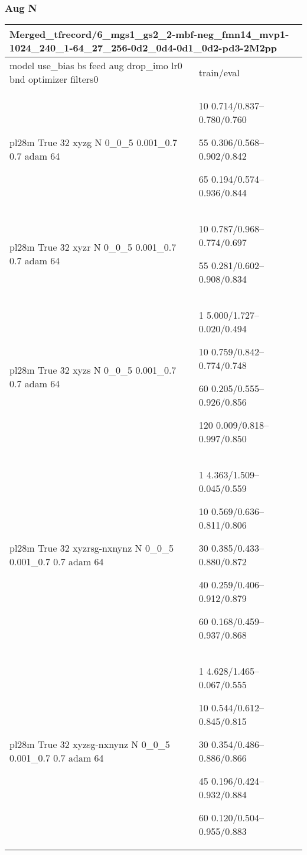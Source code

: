 \documentclass[,table,dvipsnames]{article}
\begin{document}
\subsubsection{Aug N}
\noindent\begin{tabular}{|p{9cm}|p{6cm}| }	
	\hline
	\multicolumn{2}{|p{15cm}|}{Merged\_tfrecord/6\_mgs1\_gs2\_2-mbf-neg\_fmn14\_mvp1-1024\_240\_1-64\_27\_256-0d2\_0d4-0d1\_0d2-pd3-2M2pp}\\
	\hline
	model use\_bias bs feed aug drop\_imo lr0 bnd optimizer filters0 & train/eval \\
	
	\rowcolor{red!20}
	pl28m True 32 xyzg N 0\_0\_5 0.001\_0.7 0.7 adam 64& 10 0.714/0.837--0.780/0.760\par 55 0.306/0.568--0.902/0.842\par 65 0.194/0.574--0.936/0.844\\
	
	\rowcolor{blue!20}
	pl28m True 32 xyzr N 0\_0\_5 0.001\_0.7 0.7 adam 64& 10 0.787/0.968--0.774/0.697\par 55 0.281/0.602--0.908/0.834\\
	
	\rowcolor{yellow!20}
	pl28m True 32 xyzs N 0\_0\_5 0.001\_0.7 0.7 adam 64& 1 5.000/1.727--0.020/0.494\par 10 0.759/0.842--0.774/0.748\par 60 0.205/0.555--0.926/0.856\par 120 0.009/0.818--0.997/0.850\\
	
	\rowcolor{orange!20}
	pl28m True 32 xyzrsg-nxnynz N 0\_0\_5 0.001\_0.7 0.7 adam 64& 1 4.363/1.509--0.045/0.559\par 10 0.569/0.636--0.811/0.806\par 30 0.385/0.433--0.880/0.872\par 40 0.259/0.406--0.912/0.879\par 60 0.168/0.459--0.937/0.868\\ 
	
	\rowcolor{blue!20}
	pl28m True 32 xyzsg-nxnynz N 0\_0\_5 0.001\_0.7 0.7 adam 64& 1 4.628/1.465--0.067/0.555\par 10 0.544/0.612--0.845/0.815\par 30 0.354/0.486--0.886/0.866\par 45 0.196/0.424--0.932/0.884\par 60 0.120/0.504--0.955/0.883\\
	
	\hline 
\end{tabular}
\end{document}
